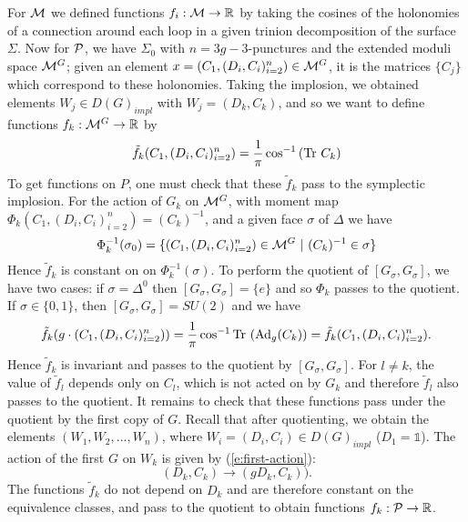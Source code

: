 	For $\mathcal{M}$ we defined functions $f_i:\mathcal{M}\to \mathbb{R}$ by taking the cosines of the holonomies of a connection around each loop in a given trinion decomposition of the surface $\Sigma$. Now for $\mathcal{P}$, we have $\Sigma_0$ with $n=3g-3$-punctures and the extended moduli space $\mathcal{M}^G$; given an element $x = (C_1,(D_i,C_i)_{i=2}^n)\in \mathcal{M}^G$, it is the matrices $\{C_j\}$ which correspond to these holonomies. Taking the implosion, we obtained elements $W_j \in D(G)_{impl}$ with $W_j = (D_k, C_k)$, and so we want to define functions $f_k:\mathcal{M}^G \to \mathbb{R}$ by 
	\begin{equation}
		\tilde{f}_k(C_1,(D_i,C_i)_{i=2}^n) = \frac{1}{\pi}\cos^{-1} \left(\text{Tr } C_k\right)
	\end{equation}
	To get functions on $P$, one must check that these $\tilde{f}_k$ pass to the symplectic implosion. For the action of $G_k$ on $\mathcal{M}^G$, with moment map $\Phi_k(C_1,(D_i,C_i)_{i=2}^n) = (C_k)^{-1}$, and a given face $\sigma$ of $\Delta$ we have
	\begin{equation}
		\Phi_k^{-1}(\sigma_0) = \{
		(C_1,(D_i,C_i)_{i=2}^n) \in \mathcal{M}^G ~|~ (C_k)^{-1} \in \sigma
		\}
	\end{equation}
	Hence $\tilde{f}_k$ is constant on on $\Phi_k^{-1}(\sigma)$. To perform the quotient of $[G_\sigma, G_\sigma]$, we have two cases: if $\sigma = \Delta^0$ then $[G_\sigma, G_\sigma] = \{e\}$ and so $\Phi_k$ passes to the quotient. If $\sigma \in \{0,1\}$, then $[G_\sigma, G_\sigma] = SU(2)$ and we have 
	\begin{equation}
		\tilde{f}_k(g\cdot \left(C_1,(D_i,C_i)_{i=2}^n)\right) = \frac{1}{\pi}\cos^{-1}\text{Tr }(\text{Ad}_{g} (C_k)) = \tilde{f}_k(C_1,(D_i,C_i)_{i=2}^n).
	\end{equation}
	Hence $\tilde{f}_k$ is invariant and passes to the quotient by $[G_\sigma,G_\sigma]$. For $l \neq k$, the value of $\tilde{f}_l$ depends only on $C_l$, which is not acted on by $G_k$ and therefore $\tilde{f}_l$ also passes to the quotient. It remains to check that these functions pass under the quotient by the first copy of $G$. Recall that after quotienting, we obtain the elements $(W_1,W_2,...,W_n)$, where $W_i=(D_i,C_i)\in D(G)_{impl}$ ($D_1 =\mathds{1}$). The action of the first $G$ on $W_k$ is given by (\ref{e:first-action}):
	\begin{equation}
		(D_k,C_k) \to (gD_k, C_k)).
	\end{equation}
	The functions $\tilde{f}_k$ do not depend on $D_k$ and are therefore constant on the equivalence classes, and pass to the quotient to obtain functions $f_k:\mathcal{P}\to \mathbb{R}$.
	
